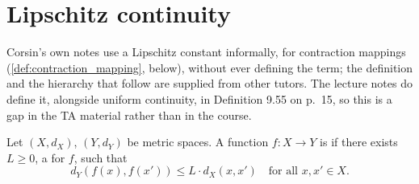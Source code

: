 
\section{Lipschitz continuity}
\label{sec:lipschitz_continuity}

\begin{ainote}
Corsin's own notes use a Lipschitz constant informally, for contraction mappings
(\cref{def:contraction_mapping}, below), without ever defining the term; the definition and the
hierarchy that follow are supplied from other tutors. The lecture notes do define it, alongside
uniform continuity, in Definition 9.55 on p.\ 15, so this is a gap in the TA material rather than
in the course.
\end{ainote}

\begin{definition}
\label{def:lipschitz_continuous}
Let $(X,d_X)$, $(Y,d_Y)$ be metric spaces. A function $f : X \to Y$ is   if there exists $L \geq 0$, a  for $f$, such that
\[d_Y(f(x),f(x')) \leq L\cdot d_X(x,x') \quad \text{for all } x,x' \in X.\]
\end{definition}

